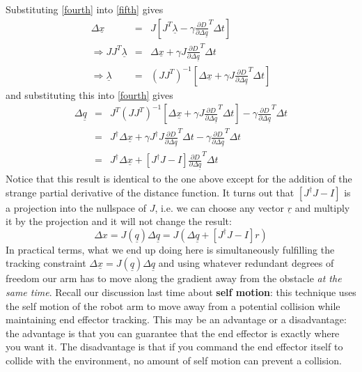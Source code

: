\documentclass[]{article}
\begin{document}
Substituting \ref{fourth} into \ref{fifth} gives
\begin{eqnarray}
    \Delta\underline{x}	& = & J\left[J^{T}\underline{\lambda} - \gamma \frac{\partial D}{\partial \Delta\underline{q}}^{T}\Delta t \right] \nonumber \\
    \Rightarrow JJ^{T}\underline{\lambda} & = & \Delta\underline{x} + \gamma J \frac{\partial D}{\partial \Delta\underline{q}}^{T}\Delta t \nonumber \\
    \Rightarrow \underline{\lambda} & = & (JJ^{T})^{-1}\left[\Delta\underline{x} + \gamma J \frac{\partial D}{\partial \Delta\underline{q}}^{T}\Delta t\right] \nonumber
\end{eqnarray}
and substituting this into \ref{fourth} gives
\begin{eqnarray}
    \Delta\underline{q} & = & J^{T}(JJ^{T})^{-1}\left[\Delta\underline{x} + \gamma J \frac{\partial D}{\partial \Delta\underline{q}}^{T}\Delta t\right] - \gamma \frac{\partial D}{\partial \Delta\underline{q}}^{T}\Delta t \nonumber \\
    & = & J^{\dag} \Delta\underline{x} + \gamma J^{\dag} J \frac{\partial D}{\partial \Delta\underline{q}}^{T}\Delta t  -\gamma \frac{\partial D}{\partial \Delta\underline{q}}^{T}\Delta t \nonumber \\
    & = & J^{\dag} \Delta\underline{x} + \left[J^{\dag}J - I\right] \frac{\partial D}{\partial \Delta\underline{q}}^{T}\Delta t 
\end{eqnarray}
Notice that this result is identical to the one above except for the addition of the strange partial derivative of the distance function. It turns out that $\left[J^{\dag}J - I\right]$ is a projection into the nullspace of $J$, i.e. we can choose any vector $\underline{r}$ and multiply it by the projection and it will not change the result:
\begin{displaymath}
   \Delta{x} = J(\underline{q})\Delta\underline{q} = J\left(\Delta\underline{q} + \left[J^{\dag}J - I\right] r\right)
\end{displaymath}
In practical terms, what we end up doing here is simultaneously fulfilling the tracking constraint $\Delta\underline{x} = J(\underline{q})\Delta\underline{q}$ and using whatever redundant degrees of freedom our arm has to move along the gradient away from the obstacle \textit{at the same time}. Recall our discussion last time about \textbf{self motion}: this technique uses the self motion of the robot arm to move away from a potential collision while maintaining end effector tracking. This may be an advantage or a disadvantage: the advantage is that you can guarantee that the end effector is exactly where you want it. The disadvantage is that if you command the end effector itself to collide with the environment, no amount of self motion can prevent a collision.
\end{document}
